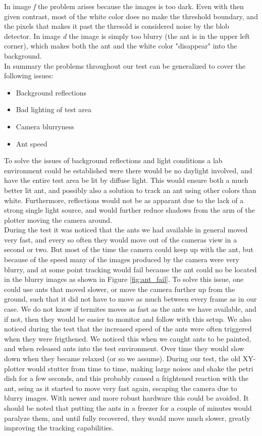In image \emph{f} the problem arises because the images is too dark. Even with then given contrast, most of the white color does no make the threshold boundary, and the pixels that makes it past the thresold is considered noise by the blob detector. In image \emph{d} the image is simply too blurry (the ant is in the upper left corner), which makes both the ant and the white color "disappear" into the background.\\

In summary the problems throughout our test can be generalized to cover the following issues:

\begin{itemize}
    \item Background reflections
    \item Bad lighting of test area
    \item Camera blurryness
    \item Ant speed
\end{itemize}

To solve the issues of background reflections and light conditions a lab environment could be established were there would be no daylight involved, and have the entire test area be lit by diffuse light. This would ensure both a much better lit ant, and possibly also a solution to track an ant using other colors than white. Furthermore, reflections would not be as apparant due to the lack of a strong single light source, and would further reduce shadows from the arm of the plotter moving the camera around.\\

During the test it was noticed that the ants we had available in general moved very fast, and every so often they would move out of the cameras view in a second or two. But most of the time the camera could keep up with the ant, but because of the speed many of the images produced by the camera were very blurry, and at some point tracking would fail because the ant could no be located in the blurry images as shown in Figure \ref{fig:ant_fail}. To solve this issue, one could use ants that moved slower, or move the camera further up from the ground, such that it did not have to move as much between every frame as in our case. We do not know if termites moves as fast as the ants we have available, and if not, then they would be easier to monitor and follow with this setup. We also noticed during the test that the increased speed of the ants were often triggered when they were frigthened. We noticed this when we caught ants to be painted, and when released ants into the test environment. Over time they would slow down when they became relaxed (or so we assume). During our test, the old XY-plotter would stutter from time to time, making large noises and shake the petri dish for a few seconds, and this probably caused a frightened reaction with the ant, seing as it started to move very fast again, escaping the camera due to blurry images. With newer and more robust hardware this could be avoided. It should be noted that putting the ants in a freezer for a couple of minutes would paralyze them, and until fully recovered, they would move much slower, greatly improving the tracking capabilities.\\

